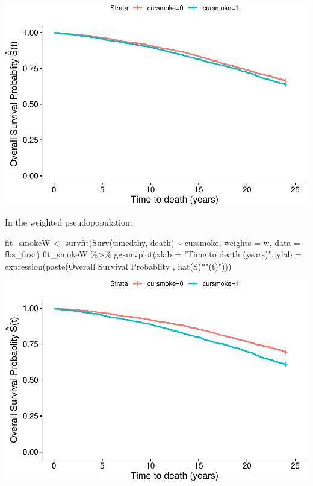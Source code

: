 \documentclass[
]{book}
\newenvironment{Shaded}{\begin{snugshade}}{\end{snugshade}}
\newcommand{\AttributeTok}[1]{\textcolor[rgb]{0.77,0.63,0.00}{#1}}
\newcommand{\FunctionTok}[1]{\textcolor[rgb]{0.00,0.00,0.00}{#1}}
\newcommand{\NormalTok}[1]{#1}
\newcommand{\OtherTok}[1]{\textcolor[rgb]{0.56,0.35,0.01}{#1}}
\newcommand{\SpecialCharTok}[1]{\textcolor[rgb]{0.00,0.00,0.00}{#1}}
\newcommand{\StringTok}[1]{\textcolor[rgb]{0.31,0.60,0.02}{#1}}
\begin{document}
\includegraphics{adv_epi_analysis_files/figure-latex/unnamed-chunk-266-1.pdf}

In the weighted pseudopopulation:

\begin{Shaded}
\begin{Highlighting}[]
\NormalTok{fit\_smokeW }\OtherTok{\textless{}{-}} \FunctionTok{survfit}\NormalTok{(}\FunctionTok{Surv}\NormalTok{(timedthy, death) }\SpecialCharTok{\textasciitilde{}}\NormalTok{ cursmoke, }
                      \AttributeTok{weights =}\NormalTok{ w, }\AttributeTok{data =}\NormalTok{ fhs\_first)}
\NormalTok{fit\_smokeW }\SpecialCharTok{\%\textgreater{}\%}
  \FunctionTok{ggsurvplot}\NormalTok{(}\AttributeTok{xlab =} \StringTok{"Time to death (years)"}\NormalTok{,}
             \AttributeTok{ylab =} \FunctionTok{expression}\NormalTok{(}\FunctionTok{paste}\NormalTok{(}\StringTok{\textquotesingle{}Overall Survival Probablity \textquotesingle{}}\NormalTok{, }
                                     \FunctionTok{hat}\NormalTok{(S)}\SpecialCharTok{*}\StringTok{"(t)"}\NormalTok{)))}
\end{Highlighting}
\end{Shaded}

\includegraphics{adv_epi_analysis_files/figure-latex/unnamed-chunk-267-1.pdf}
\end{document}
